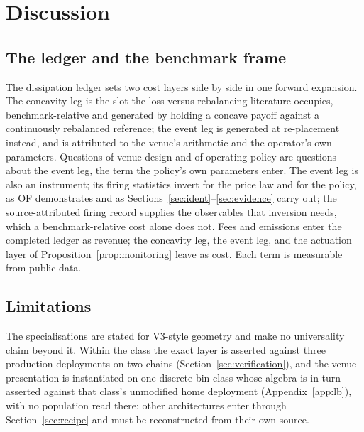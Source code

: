 \documentclass[11pt,a4paper]{article}
\theoremstyle{definition}
\theoremstyle{plain}
\theoremstyle{remark}
\begin{document}
\section{Discussion}\label{sec:discussion}

\subsection{The ledger and the benchmark frame}\label{sec:legs}

The dissipation ledger sets two cost layers side by side in one forward expansion. The concavity leg is the slot the loss-versus-rebalancing literature occupies,\cite{milionis2022} benchmark-relative 
and generated by holding a concave payoff against a continuously rebalanced reference; the event leg is generated at re-placement instead, and is attributed to the venue's arithmetic and the operator's 
own parameters. Questions of venue design and of operating policy are questions about the event leg, the term the policy's own parameters enter. The event leg is also an instrument; its firing statistics 
invert for the price law and for the policy, as OF demonstrates and as Sections~\ref{sec:ident}--\ref{sec:evidence} carry out; the source-attributed firing record supplies the observables that inversion 
needs, which a benchmark-relative cost alone does not. Fees and emissions enter the completed ledger as revenue; the concavity leg, the event leg, and the actuation layer of Proposition~\ref{prop:monitoring} 
leave as cost. Each term is measurable from public data.

\subsection{Limitations}\label{sec:limits}

The specialisations are stated for V3-style geometry and make no universality claim beyond it. Within the class the exact layer is asserted against three production deployments on two 
chains (Section~\ref{sec:verification}), and the venue presentation is instantiated on one discrete-bin class whose algebra is in turn asserted against that class's unmodified home deployment 
(Appendix~\ref{app:lb}), with no population read there; other architectures enter through Section~\ref{sec:recipe} and must be reconstructed from their own source.
\end{document}
